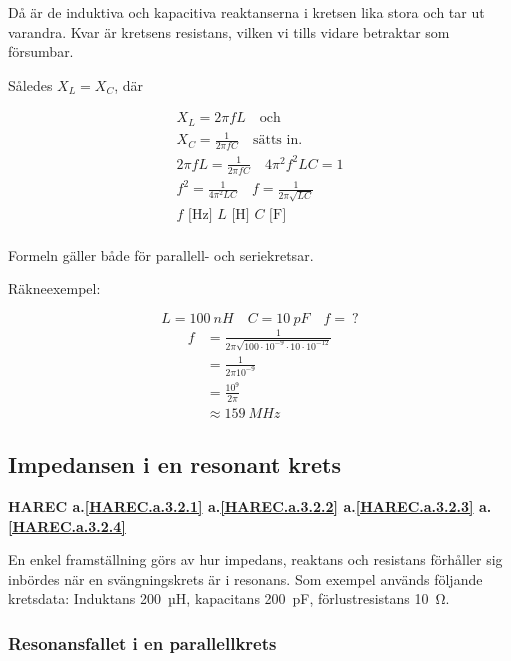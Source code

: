 Då är de induktiva och kapacitiva reaktanserna i kretsen lika stora och tar ut
varandra. Kvar är kretsens resistans, vilken vi tills vidare betraktar som
försumbar.

Således \(X_L = X_C\), där

\begin{gather*}
  X_L = 2πfL \quad \text{och} \\
  X_C = \frac{1}{2πfC} \quad \text{sätts in.} \\
  2πfL = \frac{1}{2πfC} \quad 4π^2f^2LC = 1 \\
  f^2 = \frac{1}{4π^2LC} \quad f = \frac{1}{2π\sqrt{LC}} \\
  f\text{ [Hz] }L\text{ [H] }C\text{ [F] } \\
\end{gather*}

Formeln gäller både för parallell- och seriekretsar.

Räkneexempel:

\[L = 100\ nH \quad C = 10\ pF \quad f =\ ?\]
\begin{align*}
  f &= \frac{1}{2π\sqrt{100 \cdot 10^{-9} \cdot 10 \cdot 10^{-12}}} \\
  &= \frac{1}{2π10^{-9}} \\
  &= \frac{10^9}{2π} \\
  &\approx 159\ MHz
\end{align*}

\subsection{Impedansen i en resonant krets}
\textbf{HAREC
  a.\ref{HAREC.a.3.2.1}\label{myHAREC.a.3.2.1b}
  a.\ref{HAREC.a.3.2.2}\label{myHAREC.a.3.2.2b}
  a.\ref{HAREC.a.3.2.3}\label{myHAREC.a.3.2.3}
  a.\ref{HAREC.a.3.2.4}\label{myHAREC.a.3.2.4b}
}

En enkel framställning görs av hur impedans, reaktans och resistans förhåller
sig inbördes när en svängningskrets är i resonans. Som exempel används följande
kretsdata: Induktans 200~µH, kapacitans 200~pF, förlustresistans 10~Ω.

\subsubsection{Resonansfallet i en parallellkrets}
\label{parallellresonans}

